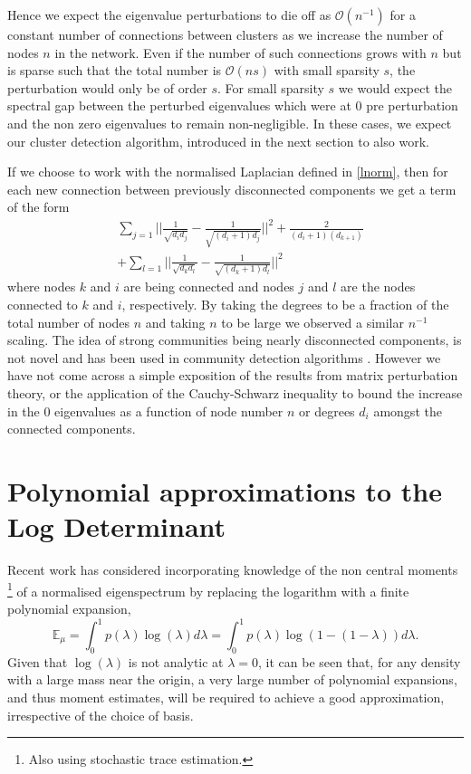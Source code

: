 \documentclass[letterpaper]{article} %
\begin{document}
Hence we expect the eigenvalue perturbations to die off as $\mathcal{O}(n^{-1})$ for a constant number of connections between clusters as we increase the number of nodes $n$ in the network. Even if the number of such connections grows with $n$ but is sparse such that the total number is $\mathcal{O}(n s)$ with small sparsity $s$, the perturbation would only be of order $s$. For small sparsity $s$ we would expect the spectral gap between the perturbed eigenvalues which were at $0$ pre perturbation and the non zero eigenvalues to remain non-negligible. In these cases, we expect our cluster detection algorithm, introduced in the next section to also work.

If we choose to work with the normalised Laplacian defined in \eqref{lnorm}, then for each new connection between previously disconnected components we get a term of the form
\begin{align}
& \sum_{j=1}\bigg|\bigg|\frac{1}{\sqrt{d_{i}d_{j}}}-\frac{1}{\sqrt{(d_{i}+1)d_{j}}}\bigg|\bigg|^{2}+\frac{2}{(d_{i}+1)(d_{k+1})} \nonumber \\
& + \sum_{l=1}\bigg|\bigg|\frac{1}{\sqrt{d_{k}d_{l}}}-\frac{1}{\sqrt{(d_{k}+1)d_{l}}}\bigg|\bigg|^{2}
\end{align}
where nodes $k$ and $i$ are being connected and nodes $j$ and $l$ are the nodes connected to $k$ and $i$, respectively. By taking the degrees to be a fraction of the total number of nodes $n$ and taking $n$ to be large we observed a similar $n^{-1}$ scaling. 
The idea of strong communities being nearly disconnected components, is not novel \citep{mcgraw2008laplacian} and has been used in community detection algorithms \citep{capocci2005detecting}. However we have not come across a simple exposition of the results from matrix perturbation theory, or the application of the Cauchy-Schwarz inequality to bound the increase in the $0$ eigenvalues as a function of node number $n$ or degrees $d_{i}$ amongst the connected components.

\section{Polynomial approximations to the Log Determinant}
Recent work \cite{han2015large,dong2017scalable,zhang2007approximate} has considered incorporating knowledge of the non central moments \footnote{Also using stochastic trace estimation.} of a normalised eigenspectrum by replacing the logarithm with a finite polynomial expansion,
\begin{equation}
\label{polynomialexpansion}
\mathbb{E}_{\mu}  =  \int_{0}^{1}p(\lambda)\log (\lambda) d\lambda = \int_{0}^{1}p(\lambda)\log (1-(1-\lambda)) d\lambda.
\end{equation}
Given that $\log(\lambda)$ is not analytic at $\lambda = 0$, it can be seen that, for any density with a large mass near the origin, a very large number of polynomial expansions, and thus moment estimates, will be required to achieve a good approximation, irrespective of the choice of basis.
\end{document}
